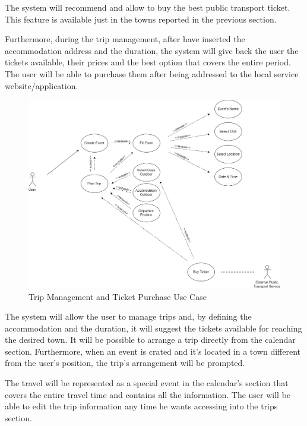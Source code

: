 The system will recommend and allow to buy the best public transport ticket. This feature is available just in the towns reported in the previous section.\par
Furthermore, during the trip management, after have inserted the accommodation address and the duration, the system will give back the user the tickets available, their prices and the best option that covers the entire period. The user will be able to purchase them after being addressed to the local service website/application. 

\begin{figure}[H]
	\centering
	\includegraphics[scale=0.25]{Images/Use_Case/Trip}
	\caption{Trip Management and Ticket Purchase Use Case}
\end{figure}
The system will allow the user to manage trips and, by defining the accommodation and the duration, it will suggest the tickets available for reaching the desired town. It will be possible to arrange a trip directly from the calendar section. Furthermore, when an event is crated and it’s located in a town different from the user’s position, the trip’s arrangement will be prompted.\par
The travel will be represented as a special event in the calendar’s section that covers the entire travel time and contains all the information.
The user will be able to edit the trip information any time he wants accessing into the trips section.

